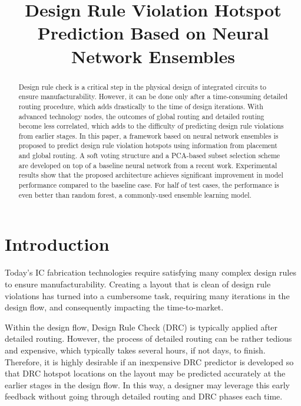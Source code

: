 \documentclass[10pt, final, letter, twocolumns]{IEEEtran}
\begin{document}
\title{Design Rule Violation Hotspot Prediction Based on Neural Network Ensembles}
\author{

}

\maketitle
{}

\begin{abstract}
Design rule check is a critical step in the physical design of integrated circuits to ensure  manufacturability. However, it can be done only after a time-consuming detailed routing procedure, which adds drastically to the time of design iterations. With advanced technology nodes, the outcomes of global routing and detailed routing become less correlated, which adds to the difficulty of predicting design rule violations from earlier stages. In this paper, a framework based on neural network ensembles is proposed to predict design rule violation hotspots using information from placement and global routing. A soft voting structure and a PCA-based subset selection scheme are developed on top of a baseline neural network from a recent work. Experimental results show that the proposed architecture achieves significant improvement in model performance compared to the baseline case. For half of test cases, the performance is even better than random forest, a commonly-used ensemble learning model.
\end{abstract}



\vspace{-2mm}
\section{Introduction}\vspace{-1mm}
\label{sec:intro}
Today's IC fabrication technologies
require satisfying many complex design rules to ensure manufacturability. Creating a layout that is clean of design rule violations has turned into a cumbersome task, requiring many iterations in the design flow, and consequently impacting the time-to-market. 

Within the design flow, Design Rule Check (DRC) is typically applied after  detailed routing. However, the process of  detailed routing can be rather tedious
and expensive, which typically takes several hours, if not days,
to finish. Therefore, it is highly  desirable if an inexpensive DRC 
predictor is developed so that DRC hotspot locations on the layout may be predicted
accurately at the earlier stages in the design flow. In this
way, a designer may leverage this early feedback without going through  detailed routing and DRC phases each time.
\end{document}
